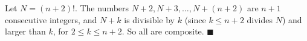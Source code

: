 Let $N=(n+2)!$. The numbers $N+2,N+3,\dots,N+(n+2)$ are $n+1$ consecutive integers, and $N+k$ is divisible by $k$ (since $k\le n+2$ divides $N$) and larger than $k$, for $2\le k\le n+2$. So all are composite. $\blacksquare$
